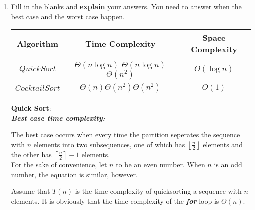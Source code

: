\documentclass[12pt,a4paper]{article}
\theoremstyle{definition}
\begin{document}
\begin{enumerate}
\begin{minipage}[t]{0.45\textwidth}
\begin{algorithm}[H]
		$i\leftarrow i+1$\;
	}
\end{algorithm}
\end{minipage}

\begin{enumerate}
	 
\item Fill in the blanks and \textbf{explain} your answers. You need to answer when the best case and the worst case happen. 
\begin{table}[!h]

\label{Tab-compare}
	\centering
	\begin{threeparttable}
	\begin{tabular}{c|c| c }
		\toprule[2pt]
		\textbf{Algorithm} & \textbf{Time Complexity}\tnote{1} & \textbf{Space Complexity} \\
		\hline
		\hline
		$QuickSort$ & $\Theta(n\log n)$ \quad $\Theta(n\log n)$ \quad $\Theta(n^2)$ & $O(\log n)$ \\
		
		$CocktailSort$ &$\Theta(n)$\quad \quad\quad $\Theta(n^2)$\quad\quad\quad $\Theta(n^2)$  & $O(1)$  \\
		\bottomrule[2pt]


	\end{tabular}
	\end{threeparttable}
\end{table}

{\large \textbf{Quick Sort}:}~\\

\textbf{\textit{Best case time complexity:}} 

The best case occurs when every time the partition seperates the sequence with $n$ elements into two subsequences, one of which has $\left \lfloor \frac{n}{2} \right \rfloor$ elements and the other has $\left \lceil \frac{n}{2} \right \rceil -1$ elements.\\
For the sake of convenience,  let $n$ to be an even number. When $n$ is an odd number, the equation is similar, however.

Assume that $T(n)$ is the time complexity of quicksorting a sequence with $n$ elements. It is obviously that the time complexity of the \textbf{\textit{for}} loop is $\Theta(n)$.


\end{enumerate}
\end{enumerate}
\end{document}
